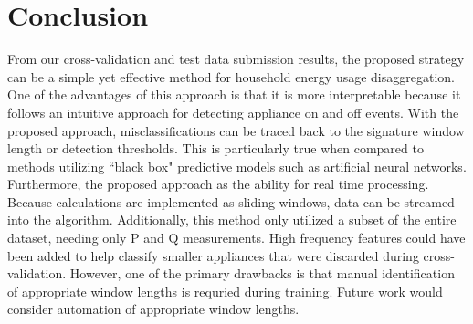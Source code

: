 \documentclass[conference]{IEEEtran}
\begin{document}
\section{Conclusion}\label{sec:concl}
From our cross-validation and test data submission results, the proposed strategy can be a simple yet effective method for household energy usage disaggregation. One of the advantages of this approach is that it is more interpretable because it follows an intuitive approach for detecting appliance on and off events.  With the proposed approach, misclassifications can be traced back to the signature window length or detection thresholds.  This is particularly true when compared to methods utilizing ``black box" predictive models such as artificial neural networks.  Furthermore, the proposed approach as the ability for real time processing. Because calculations are implemented as sliding windows, data can be streamed into the algorithm. Additionally, this method only utilized a subset of the entire dataset, needing only P and Q measurements.  High frequency features could have been added to help classify smaller appliances that were discarded during cross-validation.  However, one of the primary drawbacks is that manual identification of appropriate window lengths is requried during training.  Future work would consider automation of appropriate window lengths.



	











%
%
\end{document}
